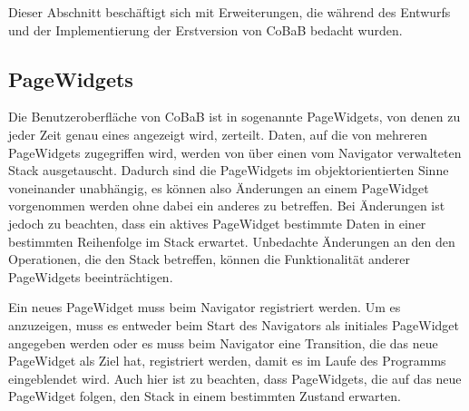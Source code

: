 Dieser Abschnitt beschäftigt sich mit Erweiterungen, die während des Entwurfs und der Implementierung der Erstversion von CoBaB bedacht wurden.

\subsection{PageWidgets}
Die Benutzeroberfläche von CoBaB ist in sogenannte PageWidgets, von denen zu jeder Zeit genau eines angezeigt wird, zerteilt.
Daten, auf die von mehreren PageWidgets zugegriffen wird, werden von über einen vom Navigator verwalteten Stack ausgetauscht.
Dadurch sind die PageWidgets im objektorientierten Sinne voneinander unabhängig, es können also Änderungen an einem PageWidget vorgenommen werden ohne dabei ein anderes zu betreffen.
Bei Änderungen ist jedoch zu beachten, dass ein aktives PageWidget bestimmte Daten in einer bestimmten Reihenfolge im Stack erwartet.
Unbedachte Änderungen an den den Operationen, die den Stack betreffen, können die Funktionalität anderer PageWidgets beeinträchtigen.

Ein neues PageWidget muss beim Navigator registriert werden. Um es anzuzeigen, muss es entweder beim Start des Navigators als initiales PageWidget angegeben werden oder es muss beim Navigator eine Transition, die das neue PageWidget als Ziel hat, registriert werden, damit es im Laufe des Programms eingeblendet wird. Auch hier ist zu beachten, dass PageWidgets, die auf das neue PageWidget folgen, den Stack in einem bestimmten Zustand erwarten.
